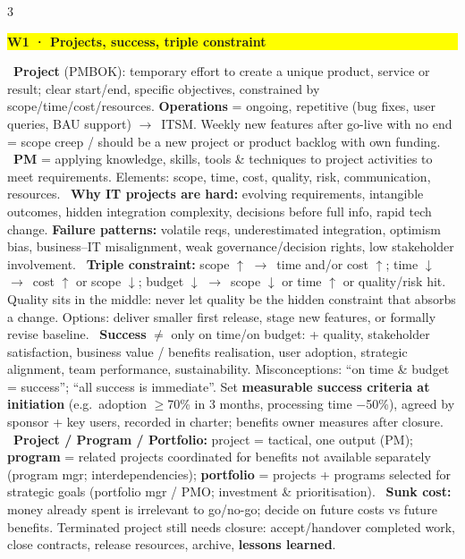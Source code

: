 \documentclass[a4paper,landscape]{article}
\newcommand{\hlhighlight}[1]{\begingroup\setlength{\fboxsep}{0pt}\colorbox{yellow}{\strut\textbf{#1}}\endgroup}
\newcommand{\concept}[1]{\textbf{#1}}
\newcommand{\lbl}[1]{\textbf{#1}}
\newcommand{\kh}[1]{{\setlength{\fboxsep}{0.5pt}\colorbox{keyhlcolor}{#1}}}
\newcommand{\ra}{$\rightarrow$}
\newcommand{\PONE}{\fontsize{5.7pt}{6.05pt}\selectfont}
\begin{document}
\PONE
\sloppy

\begin{multicols}{3}
\PONE

\par\smallskip\noindent\hlhighlight{W1 · Projects, success, triple constraint}\ \concept{Project} (PMBOK): \kh{temporary effort} to create a \kh{unique product, service or result}; clear start/end, specific objectives, constrained by scope/time/cost/resources. \concept{Operations} = ongoing, repetitive (bug fixes, user queries, BAU support) \ra\ ITSM. Weekly new features after go-live with no end = scope creep / should be a new project or product backlog with own funding. \textbullet\ \concept{PM} = applying knowledge, skills, tools \& techniques to project activities to meet requirements. Elements: scope, time, cost, quality, risk, communication, resources. \textbullet\ \concept{Why IT projects are hard:} evolving requirements, intangible outcomes, hidden integration complexity, decisions before full info, rapid tech change. \lbl{Failure patterns:} volatile reqs, underestimated integration, optimism bias, business--IT misalignment, weak governance/decision rights, low stakeholder involvement. \textbullet\ \concept{Triple constraint:} scope $\uparrow$ \ra\ time and/or cost $\uparrow$; time $\downarrow$ \ra\ cost $\uparrow$ or scope $\downarrow$; budget $\downarrow$ \ra\ scope $\downarrow$ or time $\uparrow$ or quality/risk hit. Quality sits in the middle: \kh{never let quality be the hidden constraint} that absorbs a change. Options: deliver smaller first release, stage new features, or formally revise baseline. \textbullet\ \concept{Success} $\ne$ only on time/on budget: + quality, stakeholder satisfaction, business value / benefits realisation, user adoption, strategic alignment, team performance, sustainability. Misconceptions: ``on time \& budget = success''; ``all success is immediate''. Set \lbl{measurable success criteria at initiation} (e.g.\ adoption $\ge$70\% in 3 months, processing time $-$50\%), agreed by sponsor + key users, recorded in charter; benefits owner measures after closure. \textbullet\ \concept{Project / Program / Portfolio:} project = tactical, one output (PM); \lbl{program} = related projects coordinated for benefits not available separately (program mgr; interdependencies); \lbl{portfolio} = projects + programs selected for strategic goals (portfolio mgr / PMO; investment \& prioritisation). \textbullet\ \concept{Sunk cost:} money already spent is irrelevant to go/no-go; decide on \kh{future costs vs future benefits}. Terminated project still needs closure: accept/handover completed work, close contracts, release resources, archive, \lbl{lessons learned}.\par


\end{multicols}
\end{document}
